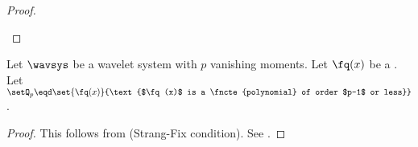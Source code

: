 \begin{proof}
\begin{enumerate}

\end{enumerate}
\end{proof}


\begin{theorem}
\label{thm:sfix_poly}
Let $\wavsys$ be a wavelet system with $p$ vanishing moments.
Let $\fq(x)$ be a .
Let
  \\\indentx$\setQ_p\eqd\set{\fq(x)}{\text{$\fq(x)$ is a \fncte{polynomial} of order $p-1$ or less}}$.\\
\end{theorem}
\begin{proof}
This follows from 
(Strang-Fix condition).
See .
\end{proof}

